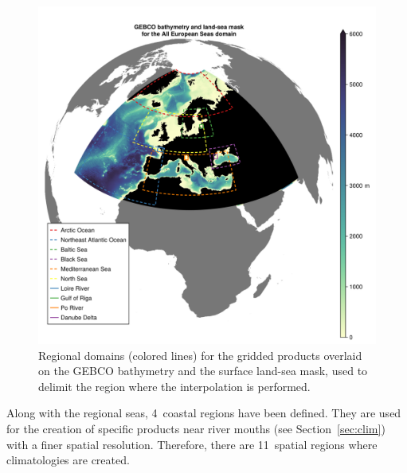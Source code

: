 \documentclass[essd,manuscript]{copernicus}
\begin{document}
\begin{figure}[t]
\includegraphics[width=12cm]{gebco_bathy_mask_domains3}
\caption{Regional domains (colored lines) for the gridded products overlaid on the GEBCO bathymetry and the surface land-sea mask, used to delimit the region where the interpolation is performed.\label{fig:gebco_bathy_mask_domains3}}
\end{figure}

Along with the regional seas, 4~coastal regions have been defined. They are used for the creation of specific products near river mouths (see Section~\ref{sec:clim}) with a finer spatial resolution. Therefore, there are 11~spatial regions where climatologies are created.
\end{document}
